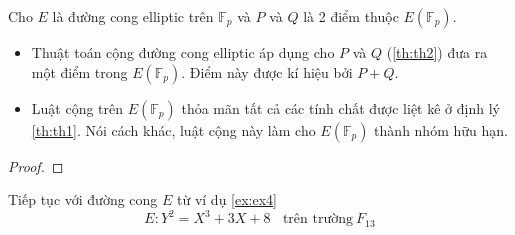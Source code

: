 \begin{theorem}
	\label{th:th3}
	Cho $E$ là đường cong elliptic trên $\mathbb{F}_p$ và $P$ và $Q$ là 2 điểm thuộc $E(\mathbb{F}_{p})$.
	\begin{itemize}
		\item Thuật toán cộng đường cong elliptic áp dụng cho $P$ và $Q$ (\ref{th:th2}) đưa ra một điểm trong $E(\mathbb{F}_{p})$.
		      Điểm này được kí hiệu bởi $P + Q$.
		\item Luật cộng trên $E(\mathbb{F}_{p})$ thỏa mãn tất cả các tính chất được liệt kê ở định lý \ref{th:th1}.
		      Nói cách khác, luật cộng này làm cho $E(\mathbb{F}_{p})$ thành nhóm hữu hạn.
	\end{itemize}
\end{theorem}

\begin{proof}

\end{proof}

\begin{example}
	\label{ex:ex5}
	Tiếp tục với đường cong $E$ từ ví dụ \ref{ex:ex4}
	$$ E: Y^2 = X^3 + 3X + 8 \ \ \ \ \text{trên trường}\  F_{13} $$
\end{example}